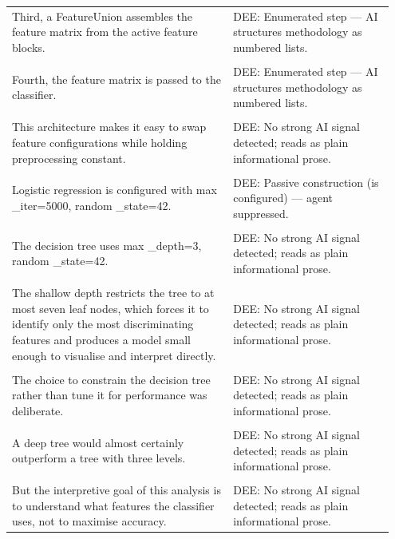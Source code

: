 \documentclass[11pt]{article}
\begin{document}
\begin{longtable}{|p{0.55\linewidth}|p{0.40\linewidth}|}
\hline
\rule{0pt}{3.5cm} & \\
\hline
Third, a FeatureUnion assembles the feature matrix from the active feature blocks. & DEE: Enumerated step --- AI structures methodology as numbered lists. \\[2pt]
\hline
\rule{0pt}{3.5cm} & \\
\hline
Fourth, the feature matrix is passed to the classifier. & DEE: Enumerated step --- AI structures methodology as numbered lists. \\[2pt]
\hline
\rule{0pt}{3.5cm} & \\
\hline
This architecture makes it easy to swap feature configurations while holding preprocessing constant. & DEE: No strong AI signal detected; reads as plain informational prose. \\[2pt]
\hline
\rule{0pt}{3.5cm} & \\
\hline
Logistic regression is configured with max \_iter=5000, random \_state=42. & DEE: Passive construction (is configured) --- agent suppressed. \\[2pt]
\hline
\rule{0pt}{3.5cm} & \\
\hline
The decision tree uses max \_depth=3, random \_state=42. & DEE: No strong AI signal detected; reads as plain informational prose. \\[2pt]
\hline
\rule{0pt}{3.5cm} & \\
\hline
The shallow depth restricts the tree to at most seven leaf nodes, which forces it to identify only the most discriminating features and produces a model small enough to visualise and interpret directly. & DEE: No strong AI signal detected; reads as plain informational prose. \\[2pt]
\hline
\rule{0pt}{3.5cm} & \\
\hline
The choice to constrain the decision tree rather than tune it for performance was deliberate. & DEE: No strong AI signal detected; reads as plain informational prose. \\[2pt]
\hline
\rule{0pt}{3.5cm} & \\
\hline
A deep tree would almost certainly outperform a tree with three levels. & DEE: No strong AI signal detected; reads as plain informational prose. \\[2pt]
\hline
\rule{0pt}{3.5cm} & \\
\hline
But the interpretive goal of this analysis is to understand what features the classifier uses, not to maximise accuracy. & DEE: No strong AI signal detected; reads as plain informational prose. \\[2pt]

\end{longtable}
\end{document}
